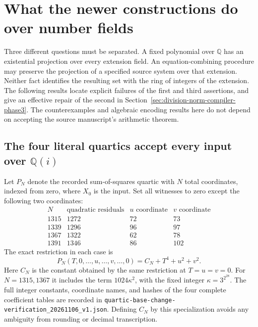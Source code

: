 \section{What the newer constructions do over number fields}
\label{sec:new-constructions-number-fields-phase3}

Three different questions must be separated.  A fixed polynomial
over $\mathbb Q$ has an existential projection over every extension
field.  An equation-combining procedure may preserve the projection
of a specified source system over that extension.  Neither fact
identifies the resulting set with the ring of integers of the
extension.  The following results locate explicit failures of the
first and third assertions, and give an effective repair of the
second in Section~\ref{sec:division-norm-compiler-phase3}.
The counterexamples and algebraic encoding results here do not
depend on accepting the source manuscript's arithmetic theorem.

\subsection{The four literal quartics accept every input over $\mathbb Q(i)$}

Let $P_N$ denote the recorded sum-of-squares quartic with $N$
total coordinates, indexed from zero, where $X_0$ is the input.
Set all witnesses to zero except the following two coordinates:
\[
\begin{array}{r|r|r|r}
N&\text{quadratic residuals}&u\text{ coordinate}&v\text{ coordinate}\\\hline
1315&1272&72&73\\
1339&1296&96&97\\
1367&1322&62&78\\
1391&1346&86&102
\end{array}
\]
The exact restriction in each case is
\begin{equation}\label{eq:quartic-two-squares-restriction-phase3}
                     P_N(T,0,\ldots,u,\ldots,v,\ldots,0)
                        =C_N+T^4+u^2+v^2.
\end{equation}
Here $C_N$ is the constant obtained by the same restriction at
$T=u=v=0$.  For $N=1315,1367$ it includes the term
$1024\kappa^2$, with the fixed integer $\kappa=3^{2^{28}}$.
The full integer constants, coordinate names, and hashes of the
four complete coefficient tables are recorded in
\texttt{quartic-base-change-verification\_20261106\_v1.json}.
Defining $C_N$ by this specialization avoids any ambiguity from
rounding or decimal transcription.

